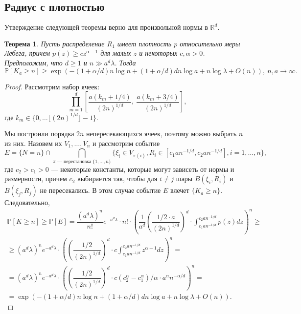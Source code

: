\documentclass[12pt]{article}
\theoremstyle{plain}
\newtheorem{thm}{Теорема} %
\theoremstyle{definition}
\theoremstyle{remark}
\def\geq{\geqslant}
\newcommand{\R}{\mathbb{R}}
\newcommand{\PP}{\mathbb{P}}
\begin{document}
\subsection{Радиус с плотностью}
Утверждение следующей теоремы верно для произвольной нормы в $\R^d$.

\begin{thm}\label{lowdens}
Пусть распределение $R_1$ имеет плотность $p$ относительно меры Лебега, причем $p(z) \geq c z^{\alpha -1}$ для малых $z$ и некоторых $c, \alpha >0$. Предположим, что $d \geq 1$ и $n \gg a^d\lambda$.
Тогда $$\PP[K_a \geq n] \geq \exp\left(-\left(1 + \alpha/d\right)n\log n + (1 + \alpha/d)dn\log a + n\log \lambda + O(n)\right), \ n, a \to \infty.$$
\end{thm}{}





\begin{proof}
Рассмотрим набор ячеек:
\begin{equation*}
    \prod_{m = 1}^d \left[\dfrac{a(k_m + 1/4)}{(2n)^{1/d}},\ \dfrac{a(k_m + 3/4)}{(2n)^{1/d}}\right],
\end{equation*}{}
где $k_m\in \{0, \ldots \lfloor(2n)^{1/d}\rfloor - 1\}$.

Мы построили порядка $2n$ непересекающихся ячеек, поэтому можно выбрать $n$ из них. Назовем их $V_1, \ldots, V_n$  и рассмотрим событие 
\begin{equation*}
    E = \{N=n\}\cap \bigcap\limits_{\pi \text{ --- перестановка } \{1, \ldots, n\}} \{\xi_i \in V_{\pi(i)}, R_i \in [c_1an^{-1/d}, c_2an^{-1/d}],  i = 1, \ldots, n\},
\end{equation*}
где $c_2 > c_1> 0$ --- некоторые константы, которые могут зависеть от нормы и размерности, причем $c_2$ выбирается так, чтобы для $i\not=j$ шары $B(\xi_i, R_i)$ и $B(\xi_j, R_j)$ не пересекались. В этом случае событие $E$ влечет $\{K_a \geq n\}$.
Следовательно, 
\begin{multline*}
    \PP[K \geq n] \geq \PP[E] = \dfrac{(a^d\lambda)^n}{n!}e^{-a^d\lambda}\cdot n! \cdot \left(\dfrac{1}{a^d}\left(\dfrac{1/2 \cdot a}{(2n)^{1/d}}\right)^d\cdot \int_{c_1an^{-1/d}}^{c_2an^{-1/d}} p(z) dz\right)^n \geq \\
    \geq (a^d\lambda)^n e^{-a^d\lambda} \cdot \left(\left(\dfrac{1/2 }{(2n)^{1/d}}\right)^d\cdot c \int_{c_1an^{-1/d}}^{c_2an^{-1/d}} z^{\alpha - 1} dz\right)^n = \\
    = (a^d\lambda)^n e^{-a^d\lambda} \cdot \left(\left(\dfrac{1/2 }{(2n)^{1/d}}\right)^d\cdot c (c_2^\alpha - c_1^\alpha)/\alpha \cdot a^\alpha n^{-\alpha/d}\right)^n = \\
    = \exp\left(-(1 + \alpha/d)n\log n + (1 + \alpha/d)dn\log a + n\log\lambda + O(n)\right).
\end{multline*}{}
\end{proof}{}
\end{document}
